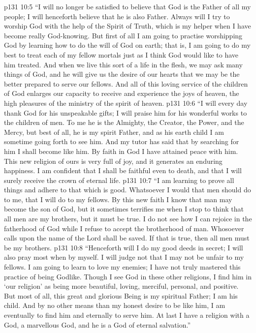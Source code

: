 \vs p131 10:5 “I will no longer be satisfied to believe that God is the Father of all my people; I will henceforth believe that he is also  Father. Always will I try to worship God with the help of the Spirit of Truth, which is my helper when I have become really God\hyp{}knowing. But first of all I am going to practise worshipping God by learning how to do the will of God on earth; that is, I am going to do my best to treat each of my fellow mortals just as I think God would like to have him treated. And when we live this sort of a life in the flesh, we may ask many things of God, and he will give us the desire of our hearts that we may be the better prepared to serve our fellows. And all of this loving service of the children of God enlarges our capacity to receive and experience the joys of heaven, the high pleasures of the ministry of the spirit of heaven.
\vs p131 10:6 “I will every day thank God for his unspeakable gifts; I will praise him for his wonderful works to the children of men. To me he is the Almighty, the Creator, the Power, and the Mercy, but best of all, he is my spirit Father, and as his earth child I am sometime going forth to see him. And my tutor has said that by searching for him I shall become like him. By faith in God I have attained peace with him. This new religion of ours is very full of joy, and it generates an enduring happiness. I am confident that I shall be faithful even to death, and that I will surely receive the crown of eternal life.
\vs p131 10:7 “I am learning to prove all things and adhere to that which is good. Whatsoever I would that men should do to me, that I will do to my fellows. By this new faith I know that man may become the son of God, but it sometimes terrifies me when I stop to think that all men are my brothers, but it must be true. I do not see how I can rejoice in the fatherhood of God while I refuse to accept the brotherhood of man. Whosoever calls upon the name of the Lord shall be saved. If that is true, then all men must be my brothers.
\vs p131 10:8 “Henceforth will I do my good deeds in secret; I will also pray most when by myself. I will judge not that I may not be unfair to my fellows. I am going to learn to love my enemies; I have not truly mastered this practice of being Godlike. Though I see God in these other religions, I find him in ‘our religion’ as being more beautiful, loving, merciful, personal, and positive. But most of all, this great and glorious Being is my spiritual Father; I am his child. And by no other means than my honest desire to be like him, I am eventually to find him and eternally to serve him. At last I have a religion with a God, a marvellous God, and he is a God of eternal salvation.”
\quizlink
